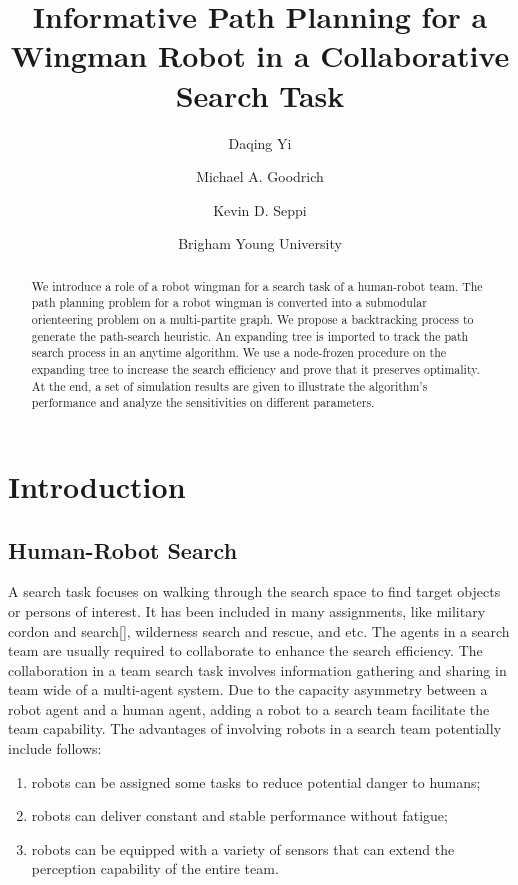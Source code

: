 \documentclass[12pt]{article}
\begin{document}
\title{\textsf{Informative Path Planning for a Wingman Robot in a Collaborative Search Task}}
\author{\textsf{Daqing Yi} \and \textsf{Michael A. Goodrich} \and \textsf{Kevin D. Seppi}}
\date{\textsf{Brigham Young University}}

\maketitle

\begin{abstract}
We introduce a role of a robot wingman for a search task of a human-robot team.
The path planning problem for a robot wingman is converted into a submodular orienteering problem on a multi-partite graph.
We propose a backtracking process to generate the path-search heuristic.
An expanding tree is imported to track the path search process in an anytime algorithm. 
We use a node-frozen procedure on the expanding tree to increase the search efficiency and prove that it preserves optimality.
At the end, a set of simulation results are given to illustrate the algorithm's performance and analyze the sensitivities on different parameters.
\end{abstract}

\section{Introduction}
\label{sec:introduction}

\subsection{Human-Robot Search}
\label{subsec:cordon_and_search}

A search task focuses on walking through the search space to find target objects or persons of interest.
It has been included in many assignments, like military cordon and search[\cite{waggener2010air}], wilderness search and rescue, and etc.  
The agents in a search team are usually required to collaborate to enhance the search efficiency.
The collaboration in a team search task involves information gathering and sharing in team wide of a multi-agent system.
Due to the capacity asymmetry between a robot agent and a human agent, adding a robot to a search team facilitate the team capability. 
The advantages of involving robots in a search team potentially include follows:
\begin{enumerate}
\item robots can be assigned some tasks to reduce potential danger to humans;
\item robots can deliver constant and stable performance without fatigue; 
\item robots can be equipped with a variety of sensors that can extend the perception capability of the entire team.
\end{enumerate}
\end{document}
